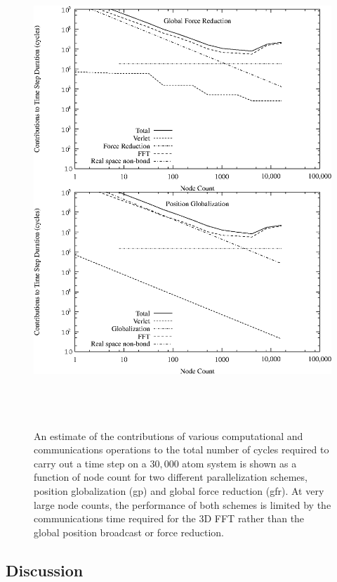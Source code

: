 \documentclass[doublespacing]{elsart}
\begin{document}
\begin{figure}[p]
\begin{center}
\includegraphics[keepaspectratio, height=7in]{estimate_contributions}
\caption{An estimate of the contributions of various computational and
communications operations to the total number of cycles required to
carry out a time step on a $30,000$ atom system is shown as a function
of node count for two different parallelization schemes, position
globalization (gp) and global force reduction (gfr). At very large
node counts, the performance of both schemes is limited by the
communications time required for the 3D FFT rather than the global
position broadcast or force reduction.}
\label{fig:estimate_contributions}
\end{center}
\end{figure}

\subsection{Discussion}
\end{document}
